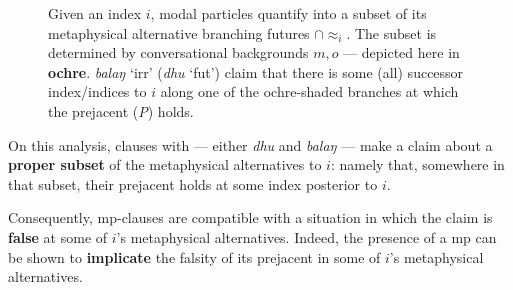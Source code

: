 \begin{figure}[h]\caption[Nonveridical operators and historic alternatives]{Given an index $ i $, modal particles quantify into a subset of its metaphysical alternative branching futures $ \cap{\approx_i} $. The subset is determined by conversational backgrounds $ m,o $ --- depicted here in {\color{ochre}\textbf{ochre}}. \textit{balaŋ} `\gls{irr}' (\textit{dhu} `\gls{fut}') claim that there is some (all) successor index/indices to $ i $ along one of the ochre-shaded branches at which the prejacent (\textit{P}) holds.}\label{nonverid}
\centering
{}\end{figure}


On this analysis, clauses with  --- either \textit{dhu} and \textit{balaŋ} --- make a claim about a \textbf{proper subset} of the metaphysical alternatives to $ i $: namely that, somewhere in that subset, their prejacent holds at some index posterior to $ i $.

Consequently, \acrshort{mp}-clauses are compatible with a situation in which the claim is \textbf{false} at some of $ i $'s metaphysical alternatives. Indeed, the presence of a \acrshort{mp} can be shown to \textbf{implicate} the falsity of its prejacent in some of $ i $'s metaphysical alternatives.

